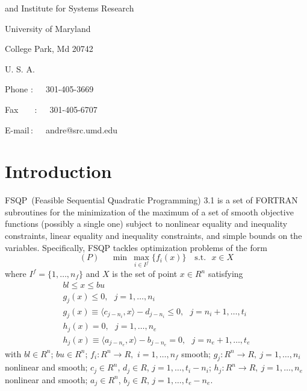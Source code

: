 \begin{titlepage}
\hspace{5em}and Institute for Systems Research

\hspace{5em}University of Maryland

\hspace{5em}College Park, Md 20742

\hspace{5em}U. S. A.

\smallskip
\hspace{5em}Phone$\,\,$:~~~301-405-3669

\hspace{5em}Fax~~~$\,\;$:~~~301-405-6707

\hspace{5em}E-mail$\,$:~~~andre@src.umd.edu
\end{titlepage}

\tableofcontents

\newpage
\section{Introduction}
FSQP~(Feasible Sequential Quadratic Programming) 3.1
is a set of FORTRAN subroutines
for the minimization of the maximum of a set of smooth 
objective functions (possibly a single one) subject to 
nonlinear equality and inequality constraints, 
linear equality and inequality constraints, 
and simple bounds on the variables. Specifically, FSQP
tackles optimization problems of the form
\smallskip
$$
  (P)~~~~~~ \min ~ \max\limits_{i\in I^f} \{f_i(x)\} 
                             \mbox{~~~s.t.~~}x\in X
$$
where $I^f=\{1,\ldots,n_f\}$ and $X$ is the set of point $x\in R^n$ 
satisfying
$$\begin{array}{l}
      bl \leq x \leq bu  \\
      g_j(x) \leq 0,~~~j=1,\ldots,n_i\\
      g_j(x)\equiv \langle c_{j-n_i},x\rangle - d_{j-n_i} \leq 0, 
      ~~~j=n_i+1,\ldots,t_i \\
      h_j(x)=0,~~~j=1,\ldots,n_e\\
      h_j(x)\equiv\langle a_{j-n_e},x \rangle-b_{j-n_e}=0, ~~~j=n_e+1,\ldots,t_
e
\end{array}$$
with $bl\in R^n$; $bu\in R^n$; 
$f_i:R^n\rightarrow R,$ $i=1,\ldots,n_f$ smooth;
$g_j:R^n\rightarrow R,~j=1,\ldots,n_i$ nonlinear and smooth;
$c_j\in R^n$, $d_j\in R$, $j=1,\ldots,t_i-n_i$;
$h_j:R^n\rightarrow R,~j=1,\ldots,n_e$ nonlinear and smooth;
$a_j\in R^n$, $b_j\in R$, $j=1,\ldots,t_e-n_e$. 

